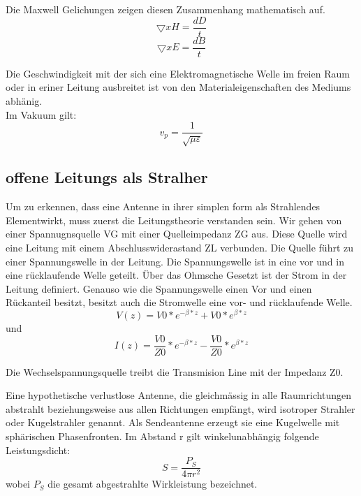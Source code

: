 Die Maxwell Gelichungen zeigen diesen Zusammenhang mathematisch auf.
\[\bigtriangledown x H =\frac{dD}{t}\]
\[\bigtriangledown x E =\frac{dB}{t}\]

Die Geschwindigkeit mit der sich eine Elektromagnetische Welle im freien Raum oder in eriner Leitung ausbreitet ist von den Materialeigenschaften des Mediums abhänig.\\
Im Vakuum gilt:
\[v_{p} =\frac{1}{\sqrt{\mu\varepsilon}}\]

\subsection*{offene Leitungs als Stralher}
Um zu erkennen, dass eine Antenne in ihrer simplen form als Strahlendes Elementwirkt, muss zuerst die Leitungstheorie verstanden sein.
Wir gehen von einer Spannugnsquelle VG mit einer Quelleimpedanz ZG aus. Diese Quelle wird eine Leitung mit einem Abschlusswiderastand ZL verbunden. Die Quelle führt zu einer Spannungswelle in der Leitung. Die Spannungswelle ist in eine vor und in eine rücklaufende Welle geteilt. Über das Ohmsche Gesetzt ist der Strom in der Leitung definiert. Genauso wie die Spannungswelle einen Vor und einen Rückanteil besitzt, besitzt auch die Stromwelle eine vor- und rücklaufende Welle.
\[V(z) = V0*e^{-\beta*z}+V0*e^{\beta*z}\]
und
\[I(z) = \dfrac{V0}{Z0}*e^{-\beta*z}-\dfrac{V0}{Z0}*e^{\beta*z}\]

Die Wechselspannungsquelle treibt die Transmision Line mit der Impedanz Z0.

Eine hypothetische verlustlose Antenne, die gleichmässig in alle Raumrichtungen abstrahlt beziehungsweise aus allen Richtungen empfängt, wird isotroper Strahler oder Kugelstrahler genannt. Als Sendeantenne erzeugt sie eine Kugelwelle mit sphärischen Phasenfronten. Im Abstand r gilt winkelunabhängig folgende Leistungsdicht:
\[S=\frac{P_{S}}{4 \pi r^{2}}\]
wobei $P_{S}$ die gesamt abgestrahlte Wirkleistung bezeichnet.


